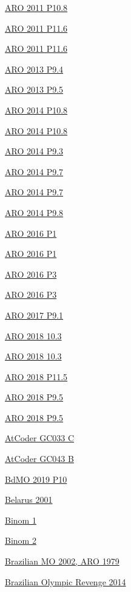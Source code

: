 \hyperref  [problem:ARO 2011 P10.8]{ARO 2011 P10.8}

\hyperref  [problem:ARO 2011 P11.6]{ARO 2011 P11.6}

\hyperref  [problem:ARO 2011 P11.6]{ARO 2011 P11.6}

\hyperref  [problem:ARO 2013 P9.4]{ARO 2013 P9.4}

\hyperref  [problem:ARO 2013 P9.5]{ARO 2013 P9.5}

\hyperref  [problem:ARO 2014 P10.8]{ARO 2014 P10.8}

\hyperref  [problem:ARO 2014 P10.8]{ARO 2014 P10.8}

\hyperref  [problem:ARO 2014 P9.3]{ARO 2014 P9.3}

\hyperref  [problem:ARO 2014 P9.7]{ARO 2014 P9.7}

\hyperref  [problem:ARO 2014 P9.7]{ARO 2014 P9.7}

\hyperref  [problem:ARO 2014 P9.8]{ARO 2014 P9.8}

\hyperref  [problem:ARO 2016 P1]{ARO 2016 P1}

\hyperref  [problem:ARO 2016 P1]{ARO 2016 P1}

\hyperref  [problem:ARO 2016 P3]{ARO 2016 P3}

\hyperref  [problem:ARO 2016 P3]{ARO 2016 P3}

\hyperref  [problem:ARO 2017 P9.1]{ARO 2017 P9.1}

\hyperref  [problem:ARO 2018 10.3]{ARO 2018 10.3}

\hyperref  [problem:ARO 2018 10.3]{ARO 2018 10.3}

\hyperref  [problem:ARO 2018 P11.5]{ARO 2018 P11.5}

\hyperref  [problem:ARO 2018 P9.5]{ARO 2018 P9.5}

\hyperref  [problem:ARO 2018 P9.5]{ARO 2018 P9.5}

\hyperref  [problem:AtCoder GC033 C]{AtCoder GC033 C}

\hyperref  [problem:AtCoder GC043 B]{AtCoder GC043 B}

\hyperref  [problem:BdMO 2019 P10]{BdMO 2019 P10}

\hyperref  [problem:Belarus 2001]{Belarus 2001}

\hyperref  [problem:Binom 1]{Binom 1}

\hyperref  [problem:Binom 2]{Binom 2}

\hyperref  [problem:Brazilian MO 2002, ARO 1979]{Brazilian MO 2002, ARO 1979}

\hyperref  [problem:Brazilian Olympic Revenge 2014]{Brazilian Olympic Revenge 2014}


